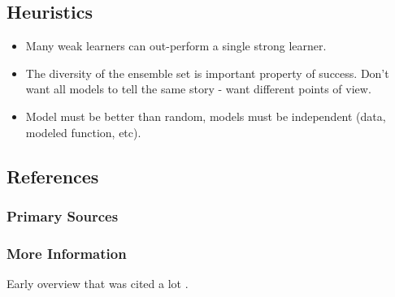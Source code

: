 \begin{bibunit}
\subsection{Heuristics}


\begin{itemize}
	\item Many weak learners can out-perform a single strong learner.
	\item The diversity of the ensemble set is important property of success. Don't want all models to tell the same story - want different points of view.
	\item Model must be better than random, models must be independent (data, modeled function, etc).
\end{itemize}


\subsection{References}

\subsubsection{Primary Sources}



\subsubsection{More Information}

Early overview that was cited a lot \cite{Dietterich2000}.

\putbib
\end{bibunit}


\newpage\begin{bibunit}\putbib\end{bibunit}
\newpage\begin{bibunit}\putbib\end{bibunit}
\newpage\begin{bibunit}\putbib\end{bibunit}
\newpage\begin{bibunit}\putbib\end{bibunit}
